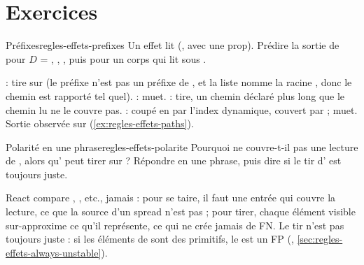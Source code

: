 \section{Exercices}
\label{sec:regles-effets-exercices}

\begin{exercice}{Préfixes}{regles-effets-prefixes}
Un effet lit  (, avec  une prop). Prédire la sortie de  pour $D$ = \code{[x.b]}, \code{[x]}, \code{[x.a.b]}, puis pour un corps qui lit  sous \code{[x.a, i]}.
\end{exercice}
\begin{solution}
\code{[x.b]} : tire sur  (le préfixe  n'est pas un préfixe de , et la liste nomme la racine , donc le chemin est rapporté tel quel). \code{[x]} : muet. \code{[x.a.b]} : tire, un chemin déclaré plus long que le chemin lu ne le couvre pas.  : coupé en  par l'index dynamique, couvert par  ; muet. Sortie observée sur  (\cref{ex:regles-effets-paths}).
\end{solution}

\begin{exercice}{Polarité en une phrase}{regles-effets-polarite}
Pourquoi \code{[...rows]} ne couvre-t-il pas une lecture de , alors qu' peut tirer sur  ? Répondre en une phrase, puis dire si le tir d' est toujours juste.
\end{exercice}
\begin{solution}
React compare , , etc., jamais  : pour se taire, il faut une entrée qui couvre la lecture, ce que la source d'un spread n'est pas ; pour tirer, chaque élément visible sur-approxime ce qu'il représente, ce qui ne crée jamais de FN. Le tir n'est pas toujours juste : si les éléments de  sont des primitifs, le \Warning{} est un FP (, \cref{sec:regles-effets-always-unstable}).
\end{solution}

